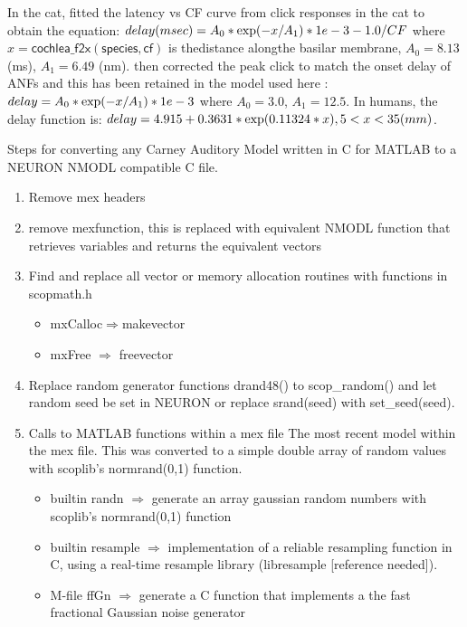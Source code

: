 In the cat, \citet{CarneyYin:1988} fitted the latency vs CF curve from click
responses in the cat to obtain the equation: \( delay (msec) = A_0 * {\rm exp}(
-x / A_1 ) * 1e-3 - 1.0/CF \) where $x = \mathsf{cochlea\_f2x(species, cf)}$ is
thedistance alongthe basilar membrane, $A_0 = 8.13$ (ms), $A_1 = 6.49$
(nm). \citet{HeinzZhangEtAl:2001} then corrected the peak click to match the
onset delay of ANFs and this has been retained in the model used here
\citep{ZilanyBruceEtAl:2009}: \(delay = A_0 * {\rm exp}(-x / A_1) * 1e-3 \)
where $A_0 = 3.0$, $A_1 = 12.5$. In humans, the delay function is: \( delay =
4.915 + 0.3631 * {\rm exp}(0.11324*x) , 5<x<35 (mm) \).

\medskip{}

Steps for converting any Carney Auditory Model written in C for MATLAB to a
NEURON NMODL compatible C file.
\begin{enumerate} 
\item Remove mex headers 
\item remove \textsf{mexfunction}, this is replaced with equivalent NMODL
  function that retrieves variables and returns the equivalent vectors
\item Find and replace all vector or memory allocation routines with functions
  in scopmath.h
\begin{itemize} 
\item \textsf{mxCalloc}$\Rightarrow$\textsf{makevector}
\item \textsf{mxFree} $\Rightarrow$ \textsf{freevector}
\end{itemize} 
\item Replace random generator functions \textsf{drand48()} to
  \mbox{\textsf{scop\_random()}} and let random seed be set in NEURON or replace
  \textsf{srand(seed)} with \mbox{\textsf{set\_seed(seed)}}.
\item Calls to MATLAB functions within a mex file The most recent model within
  the mex file.  This was converted to a simple double array of random values
  with scoplib's \mbox{\textsf{normrand(0,1)}} function.
\begin{itemize}
\item builtin \textsf{randn} $\Rightarrow$ generate an array gaussian random numbers with scoplib's
  \mbox{\textsf{normrand(0,1)}} function
\item builtin \textsf{resample} $\Rightarrow$ implementation of a reliable resampling function in C, using
  a real-time resample library (libresample [reference needed]).
\item M-file \textsf{ffGn} $\Rightarrow$ generate a C function that implements a the fast fractional Gaussian noise generator
\end{itemize}

\end{enumerate}





